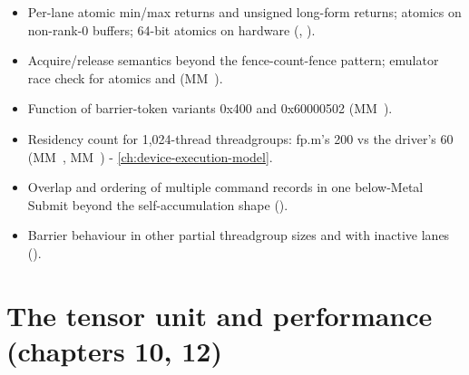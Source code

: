 \begin{itemize}
\item Per-lane atomic min/max returns and unsigned long-form returns; atomics on non-rank-0 buffers; 64-bit atomics on hardware
  (, ).
\item Acquire/release semantics beyond the fence-count-fence pattern; emulator race check for atomics and  (MM~).
\item Function of barrier-token variants 0x400 and 0x60000502 (MM~).
\item Residency count for 1,024-thread threadgroups: fp.m's 200 vs the driver's 60 (MM~, MM~) - \cref{ch:device-execution-model}.
\item Overlap and ordering of multiple command records in one below-Metal Submit beyond the self-accumulation shape
  ().
\item Barrier behaviour in other partial threadgroup sizes and with inactive lanes ().
\end{itemize}

\section{The tensor unit and performance (chapters 10, 12)}\label{sec:tensor-unit-performance}


